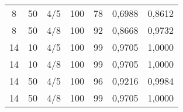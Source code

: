 \begin{table}[H]
\begin{tabular}{@{}ccccccc@{}}
8                                                     & 50                                                        & 4/5 & 100 & 78 & 0,6988        & 0,8612       \\
8                                                     & 50                                                        & 4/8 & 100 & 92 & 0,8668        & 0,9732       \\
14                                                    & 10                                                        & 4/5 & 100 & 99 & 0,9705        & 1,0000       \\
14                                                    & 10                                                        & 4/8 & 100 & 99 & 0,9705        & 1,0000       \\
14                                                    & 50                                                        & 4/5 & 100 & 96 & 0,9216        & 0,9984       \\
14                                                    & 50                                                        & 4/8 & 100 & 99 & 0,9705        & 1,0000       \\ \bottomrule
\end{tabular}
\end{table}





